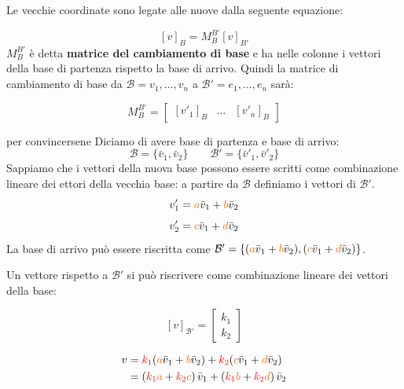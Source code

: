 \documentclass[x11names]{article}
\begin{document}
\noindent
Le vecchie coordinate sono legate alle nuove dalla seguente equazione:

\[
\left[v\right]_{B} = M_{B}^{B'} \left[v\right]_{B'}
\] 
$M_{B}^{B'}$ è detta  \textbf{matrice del cambiamento di base} e ha nelle colonne i vettori della base di partenza rispetto la base di arrivo. Quindi la matrice di cambiamento di base da $\mathscr{B} = {v_1,\dots,v_{n}}$ a $\mathscr{B}' = {e_{1},\dots,e_{n}}$ sarà:


\[
M_{B}^{B'} =
\left[\begin{array}{c|c|c}
     \left[v'_1\right]_{B}
&  \dots & \left[v'_{n}\right]_{B}
\end{array}
\right]
\] 

\begin{es}{per convincersene}
Diciamo di avere base di partenza e base di arrivo:
\[
\mathscr{B} = \{\bar{v}_{1},\bar{v}_{2}\} \qquad \mathscr{B}' = \{\bar{v}'_{1},\bar{v}'_{2}\}
\]
Sappiamo che i vettori della nuova base possono essere scritti come combinazione lineare dei ettori della vecchia base: a partire da $\mathcal{B}$ definiamo i vettori di $\mathcal{B}'$.
\[
v'_{1} = \textcolor{myorange}{a}\bar{v}_{1} + \textcolor{myorange}{b}\bar{v}_{2}
\]
\[
v'_{2} = \textcolor{myorange}{c}\bar{v}_{1} + \textcolor{myorange}{d}\bar{v}_{2}
\]
La base di arrivo può essere riscritta come $ \mathcal{B}' = \left\{(\textcolor{myorange}{a}\bar{v}_{1} + \textcolor{myorange}{b}\bar{v}_{2}),(\textcolor{myorange}{c}\bar{v}_{1} + \textcolor{myorange}{d}\bar{v}_{2}) \right\}$.

Un vettore rispetto a $\mathcal{B}'$ si può riscrivere come combinazione lineare dei vettori della base:

\[
\left[v\right]_{\mathcal{B}'}  = \left[\begin{array}{c}
		k_{1} \\ k_{2}
\end{array} \right]
\]

\begin{align*}
	v &= \textcolor{red}{k_{1}}(\textcolor{myorange}{a}\bar{v}_{1} + \textcolor{myorange}{b}\bar{v}_{2}) + \textcolor{red}{k_{2}}(\textcolor{myorange}{c}\bar{v}_{1} + \textcolor{myorange}{d}\bar{v}_{2}) \\
	&= \left(\textcolor{red}{k_{1}}\textcolor{myorange}{a} + \textcolor{red}{k_{2}}\textcolor{myorange}{c}\right)\bar{v}_{1} + 
	\left(\textcolor{red}{k_{1}}\textcolor{myorange}{b} + \textcolor{red}{k_{2}}\textcolor{myorange}{d} \right)\bar{v}_{2} 
\end{align*}
\end{es}
\end{document}
